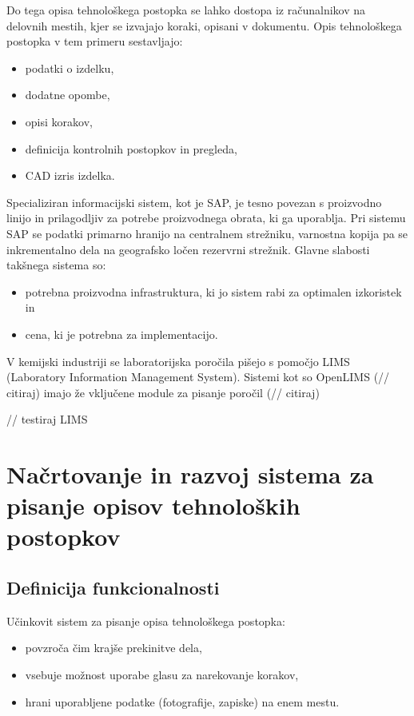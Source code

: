 \documentclass[a4paper, 12pt]{book}
\begin{document}
Do tega opisa tehnološkega postopka se lahko dostopa iz računalnikov na delovnih mestih, kjer se izvajajo koraki, opisani v dokumentu.
Opis tehnološkega postopka v tem primeru sestavljajo:
\begin{itemize}
	\item podatki o izdelku,
	\item dodatne opombe,
	\item opisi korakov,
	\item definicija kontrolnih postopkov in pregleda, 
	\item CAD izris izdelka.
\end{itemize}

Specializiran informacijski sistem, kot je SAP, je tesno povezan s proizvodno linijo in prilagodljiv za potrebe proizvodnega obrata, ki ga uporablja.
Pri sistemu SAP se podatki primarno hranijo na centralnem strežniku, varnostna kopija pa se inkrementalno dela na geografsko ločen rezervrni strežnik.
Glavne slabosti takšnega sistema so:
\begin{itemize}
	\item potrebna proizvodna infrastruktura, ki jo sistem rabi za optimalen izkoristek in
	\item cena, ki je potrebna za implementacijo.
\end{itemize}

V kemijski industriji se laboratorijska poročila pišejo s pomočjo LIMS (Laboratory Information Management System).
Sistemi kot so OpenLIMS (// citiraj) imajo že vključene module za pisanje poročil (// citiraj)

// testiraj LIMS 


\chapter{Načrtovanje in razvoj sistema za pisanje opisov tehnoloških postopkov}

\section{Definicija funkcionalnosti}

Učinkovit sistem za pisanje opisa tehnološkega postopka:
\begin{itemize}
	\item povzroča čim krajše prekinitve dela,
	\item vsebuje možnost uporabe glasu za narekovanje korakov,
	\item hrani uporabljene podatke (fotografije, zapiske) na enem mestu.
\end{itemize}
\end{document}
